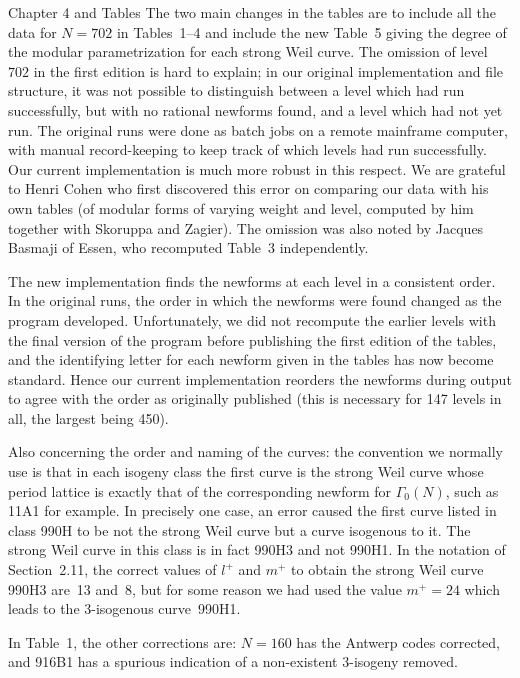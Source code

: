 \subhead Chapter 4 and Tables \endsubhead  %
%
The two main changes in the tables are to include all the data for
$N=702$ in Tables~1--4 and include the new Table~5 giving the degree
of the modular parametrization for each strong Weil curve.  The
omission of level $702$ in the first edition is hard to explain; in
our original implementation and file structure, it was not possible to
distinguish between a level which had run successfully, but with no
rational newforms found, and a level which had not yet run.  The
original runs were done as batch jobs on a remote mainframe computer,
with manual record-keeping to keep track of which levels had run
successfully.  Our current implementation is much more robust in this
respect.  We are grateful to Henri Cohen who first discovered this
error on comparing our data with his own tables (of modular forms of
varying weight and level, computed by him together with Skoruppa and
Zagier).  The omission was also noted by Jacques Basmaji of Essen, who
recomputed Table~3 independently.

The new implementation finds the newforms at each level in a
consistent order.  In the original runs, the order in which the
newforms were found changed as the program developed.  Unfortunately,
we did not recompute the earlier levels with the final version of the
program before publishing the first edition of the tables, and the
identifying letter for each newform given in the tables has now become
standard.  Hence our current implementation reorders the newforms
during output to agree with the order as originally published (this is
necessary for 147 levels in all, the largest being 450).

Also concerning the order and naming of the curves: the convention we
normally use is that in each isogeny class the first curve is the
strong Weil curve whose period lattice is exactly that of the
corresponding newform for $\Gamma_0(N)$, such as 11A1 for example.  In
precisely one case, an error caused the first curve listed in class
990H to be not the strong Weil curve but a curve isogenous to it.
The strong Weil curve in this class is in fact 990H3 and not 990H1.
In the notation of Section~2.11, the correct values of $l^+$
and $m^+$ to obtain the strong Weil curve 990H3 are~13 and~8, but for
some reason we had used the value $m^+=24$ which leads to the
3-isogenous curve~990H1.

In Table~1, the other corrections are: $N=160$ has the Antwerp codes
corrected, and 916B1 has a spurious indication of a non-existent
3-isogeny removed. 


